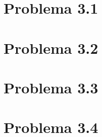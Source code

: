\section{Problema 3.1}

\newpage

\section{Problema 3.2}

\newpage

\section{Problema 3.3}

\newpage

\section{Problema 3.4}
